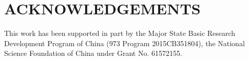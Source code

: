 \documentclass{article}
\begin{document}
\section{ACKNOWLEDGEMENTS}
\label{sec:acknowledgements}

This work has been supported in part by the Major State Basic Research Development Program of China (973 Program 2015CB351804), the National Science Foundation of China under Grant No. 61572155.




\end{document}
